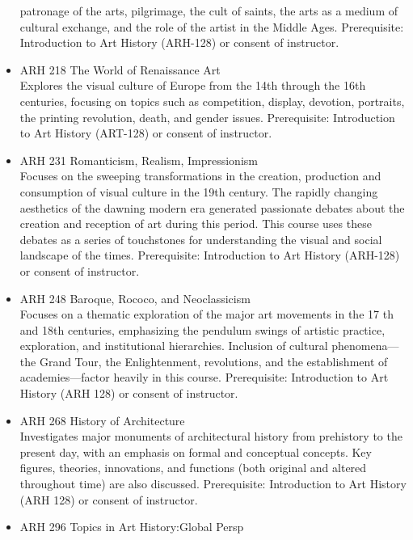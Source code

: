 \documentclass[
  letterpaper,
]{scrbook}
\begin{document}
\begin{itemize}
  patronage of the arts, pilgrimage, the cult of saints, the arts as a
  medium of cultural exchange, and the role of the artist in the Middle
  Ages. Prerequisite: Introduction to Art History (ARH-128) or consent
  of instructor.\\
\item
  ARH 218 The World of Renaissance Art\\
  Explores the visual culture of Europe from the 14th through the 16th
  centuries, focusing on topics such as competition, display, devotion,
  portraits, the printing revolution, death, and gender issues.
  Prerequisite: Introduction to Art History (ART-128) or consent of
  instructor.\\
\item
  ARH 231 Romanticism, Realism, Impressionism\\
  Focuses on the sweeping transformations in the creation, production
  and consumption of visual culture in the 19th century. The rapidly
  changing aesthetics of the dawning modern era generated passionate
  debates about the creation and reception of art during this period.
  This course uses these debates as a series of touchstones for
  understanding the visual and social landscape of the times.
  Prerequisite: Introduction to Art History (ARH-128) or consent of
  instructor.\\
\item
  ARH 248 Baroque, Rococo, and Neoclassicism\\
  Focuses on a thematic exploration of the major art movements in the 17
  th and 18th centuries, emphasizing the pendulum swings of artistic
  practice, exploration, and institutional hierarchies. Inclusion of
  cultural phenomena---the Grand Tour, the Enlightenment, revolutions,
  and the establishment of academies---factor heavily in this course.
  Prerequisite: Introduction to Art History (ARH 128) or consent of
  instructor.\\
\item
  ARH 268 History of Architecture\\
  Investigates major monuments of architectural history from prehistory
  to the present day, with an emphasis on formal and conceptual
  concepts. Key figures, theories, innovations, and functions (both
  original and altered throughout time) are also discussed.
  Prerequisite: Introduction to Art History (ARH 128) or consent of
  instructor.\\
\item
  ARH 296 Topics in Art History:Global Persp\\

\end{itemize}
\end{document}

